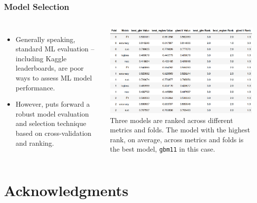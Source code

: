 \documentclass[11pt,aspectratio=169,hyperref={colorlinks}]{beamer}
\begin{document}
	\subsection*{}
	
	\begin{frame}
	
		\frametitle{Model Selection}		
	
	\begin{columns}
		
		\begin{itemize}
			\item Generally speaking, standard ML evaluation -- including Kaggle leaderboards, are poor ways to assess ML model performance.
			\item However, \cite{caruana2004kdd} puts forward a robust model evaluation and selection technique based on cross-validation and ranking. 
		\end{itemize}
	
		\centering
		\includegraphics[height=130pt]{../img/cv_ranking.png}\vspace{5pt}
		\scriptsize{Three models are ranked across different metrics and folds. The model with the highest rank, on average, across metrics and folds is the best model, \texttt{gbm11} in this case.}
		

		
	\end{columns}
	
\end{frame}	

\section{Acknowledgments}

\subsection*{}
\end{document}
